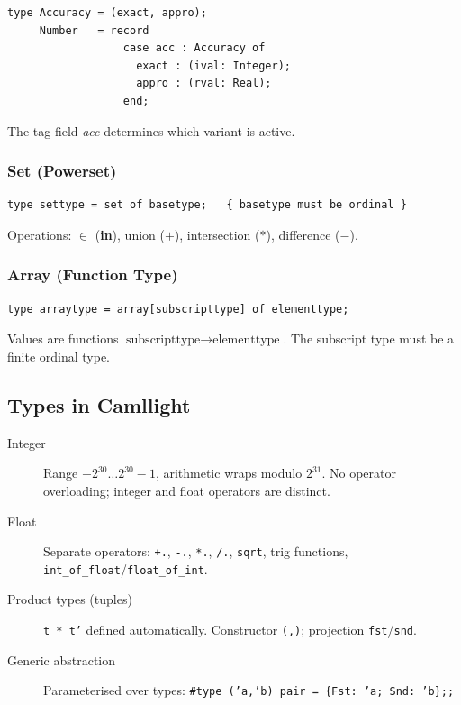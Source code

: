 \documentclass[12pt,a4paper]{article}
\begin{document}
\begin{lstlisting}[style=pascal,numbers=none]
type Accuracy = (exact, appro);
     Number   = record
                  case acc : Accuracy of
                    exact : (ival: Integer);
                    appro : (rval: Real);
                  end;
\end{lstlisting}
The tag field \textit{acc} determines which variant is active.

\subsubsection{Set (Powerset)}

\begin{lstlisting}[style=pascal,numbers=none]
type settype = set of basetype;   { basetype must be ordinal }
\end{lstlisting}
Operations: $\in$ (\textbf{in}), union ($+$), intersection ($*$), difference ($-$).

\subsubsection{Array (Function Type)}

\begin{lstlisting}[style=pascal,numbers=none]
type arraytype = array[subscripttype] of elementtype;
\end{lstlisting}
Values are functions $\text{subscripttype} \to \text{elementtype}$.
The subscript type must be a finite ordinal type.

\subsection{Types in Camllight}

\begin{description}
  \item[Integer] Range $-2^{30} \ldots 2^{30}-1$, arithmetic wraps modulo $2^{31}$.
        No operator overloading; integer and float operators are distinct.
  \item[Float] Separate operators: \texttt{+.}, \texttt{-.}, \texttt{*.}, \texttt{/.},
        \texttt{sqrt}, trig functions, \texttt{int\_of\_float}/\texttt{float\_of\_int}.
  \item[Product types (tuples)] \texttt{t * t'} defined automatically.
        Constructor \texttt{(,)}; projection \texttt{fst}/\texttt{snd}.
  \item[Generic abstraction] Parameterised over types:
        \texttt{\#type ('a,'b) pair = \{Fst: 'a; Snd: 'b\};;}
\end{description}
\end{document}
